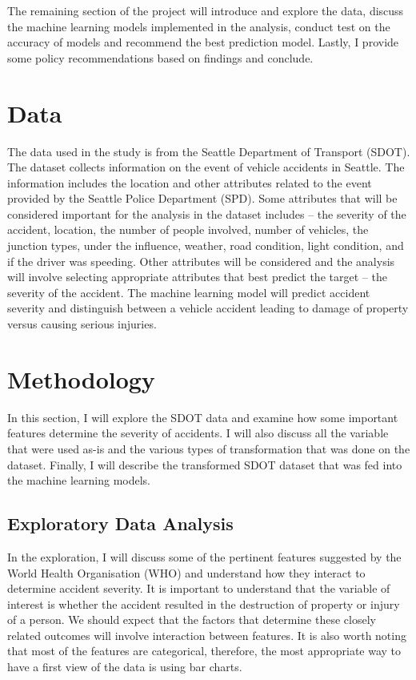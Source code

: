\documentclass[a4paper,12pt]{article}
\begin{document}
The remaining section of the project will introduce and explore the data, discuss the machine learning models implemented in the analysis, conduct test on the accuracy of models and recommend the best prediction model. Lastly, I provide some policy recommendations based on findings and conclude.

\section{Data}
The data used in the study is from the Seattle Department of Transport (SDOT). The dataset collects information on the event of vehicle accidents in Seattle. The information includes the location and other attributes related to the event provided by the Seattle Police Department (SPD). Some attributes that will be considered important for the analysis in the dataset includes – the severity of the accident, location, the number of people involved, number of vehicles, the junction types, under the influence, weather, road condition, light condition, and if the driver was speeding. Other attributes will be considered and the analysis will involve selecting appropriate attributes that best predict the target – the severity of the accident. The machine learning model will predict accident severity and distinguish between a vehicle accident leading to damage of property versus causing serious injuries.

\newpage
\section{Methodology}
In this section, I will explore the SDOT data and examine how some important features determine the severity of accidents. I will also discuss all the variable that were used as-is and the various types of transformation that was done on the dataset. Finally, I will describe the transformed SDOT dataset that was fed into the machine learning models.

\subsection{Exploratory Data Analysis}
In the exploration, I will discuss some of the pertinent features suggested by the World Health Organisation (WHO) and understand how they interact to determine accident severity. It is important to understand that the variable of interest is whether the accident resulted in the destruction of property or injury of a person. We should expect that the factors that determine these closely related outcomes will involve interaction between features. It is also worth noting that most of the features are categorical, therefore, the most appropriate way to have a first view of the data is using bar charts.\\
\end{document}
